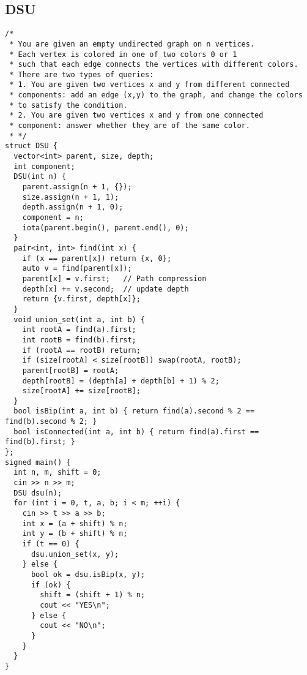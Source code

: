 \documentclass[twoside]{article}
\begin{document}
\begin{multicols*}{2}
{
\subsection*{DSU}
}
\begin{verbatim}
/*
 * You are given an empty undirected graph on n vertices.
 * Each vertex is colored in one of two colors 0 or 1
 * such that each edge connects the vertices with different colors.
 * There are two types of queries:
 * 1. You are given two vertices x and y from different connected
 * components: add an edge (x,y) to the graph, and change the colors
 * to satisfy the condition.
 * 2. You are given two vertices x and y from one connected
 * component: answer whether they are of the same color.
 * */
struct DSU {
  vector<int> parent, size, depth;
  int component;
  DSU(int n) {
    parent.assign(n + 1, {});
    size.assign(n + 1, 1);
    depth.assign(n + 1, 0);
    component = n;
    iota(parent.begin(), parent.end(), 0);
  }
  pair<int, int> find(int x) {
    if (x == parent[x]) return {x, 0};
    auto v = find(parent[x]);
    parent[x] = v.first;   // Path compression
    depth[x] += v.second;  // update depth
    return {v.first, depth[x]};
  }
  void union_set(int a, int b) {
    int rootA = find(a).first;
    int rootB = find(b).first;
    if (rootA == rootB) return;
    if (size[rootA] < size[rootB]) swap(rootA, rootB);
    parent[rootB] = rootA;
    depth[rootB] = (depth[a] + depth[b] + 1) % 2;
    size[rootA] += size[rootB];
  }
  bool isBip(int a, int b) { return find(a).second % 2 == find(b).second % 2; }
  bool isConnected(int a, int b) { return find(a).first == find(b).first; }
};
signed main() {
  int n, m, shift = 0;
  cin >> n >> m;
  DSU dsu(n);
  for (int i = 0, t, a, b; i < m; ++i) {
    cin >> t >> a >> b;
    int x = (a + shift) % n;
    int y = (b + shift) % n;
    if (t == 0) {
      dsu.union_set(x, y);
    } else {
      bool ok = dsu.isBip(x, y);
      if (ok) {
        shift = (shift + 1) % n;
        cout << "YES\n";
      } else {
        cout << "NO\n";
      }
    }
  }
}

\end{verbatim}

{
}
\end{multicols*}
\end{document}
